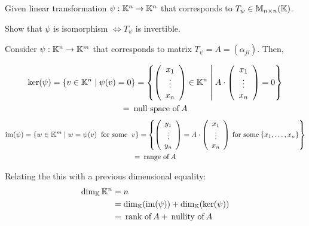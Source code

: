 \begin{exercise}
    Given linear transformation \(\psi: \mathbb{K}^n \to \mathbb{K}^n\) that corresponds to \(T_\psi \in \mathbb{M}_{n \times n}(\mathbb{K})\).

    Show that \(\psi\) is isomorphism \(\Leftrightarrow T_\psi\) is invertible.
\end{exercise}

\begin{remark}
    Consider \(\psi: \mathbb{K}^n \to \mathbb{K}^m\) that corresponds to matrix \(T_\psi = A = (\alpha_{ji})\). Then,

    \begin{multline*}
        \ker(\psi) = \{v \in \mathbb{K}^n \mid \psi(v) = 0\} = \left\{\left(\begin{array}{c}
                x_1 \\ \vdots \\ x_n
            \end{array}\right) \in \mathbb{K}^n \;\middle|\; A \cdot \left(\begin{array}{c}
                x_1 \\ \vdots \\ x_n
            \end{array}\right) = 0 \right\} \\
        = \:\text{null space of}\:A
    \end{multline*}
    \begin{multline*}
        \mathrm{im}(\psi) = \{w \in \mathbb{K}^m \mid w = \psi(v) \:\text{ for some }\: v\} = \left\{\left(\begin{array}{c}
                y_1 \\ \vdots \\y_n
            \end{array}\right) = A \cdot \left(\begin{array}{c}
                x_1 \\ \vdots \\ x_n
            \end{array}\right) \:\text{for some}\: \{x_1, \dots, x_n\}\right\} \\
            = \:\text{range of}\: A
    \end{multline*}
\end{remark}

\begin{recall}
    Relating the this with a previous dimensional equality:
    \begin{align*}
        \dim_{\mathbb{K}} \mathbb{K}^n &= n \\
        &= \dim_{\mathbb{K}} (\mathrm{im}(\psi)) + \dim_{\mathbb{K}} (\ker(\psi))\\
        &= \:\text{rank of}\: A + \:\text{nullity of}\: A
    \end{align*}
\end{recall}

